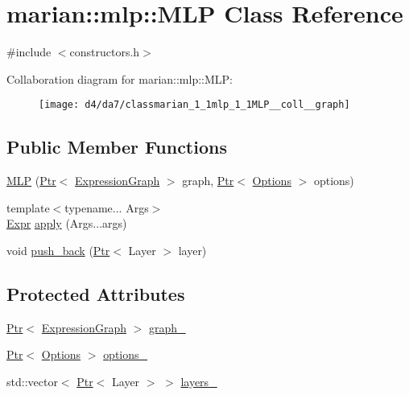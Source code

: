 \hypertarget{classmarian_1_1mlp_1_1MLP}{}\section{marian\+:\+:mlp\+:\+:M\+LP Class Reference}
\label{classmarian_1_1mlp_1_1MLP}


{\ttfamily \#include $<$constructors.\+h$>$}



Collaboration diagram for marian\+:\+:mlp\+:\+:M\+LP\+:
\nopagebreak
\begin{figure}[H]
\begin{center}
\leavevmode
\texttt{[image: d4/da7/classmarian\_1\_1mlp\_1\_1MLP\_\_coll\_\_graph]}
\end{center}
\end{figure}
\subsection*{Public Member Functions}
\begin{DoxyCompactItemize}
\item 
\hyperlink{classmarian_1_1mlp_1_1MLP_a40be5a4c5ed64d560e9c302998b0244b}{M\+LP} (\hyperlink{namespacemarian_ad1a373be43a00ef9ce35666145137b08}{Ptr}$<$ \hyperlink{classmarian_1_1ExpressionGraph}{Expression\+Graph} $>$ graph, \hyperlink{namespacemarian_ad1a373be43a00ef9ce35666145137b08}{Ptr}$<$ \hyperlink{classmarian_1_1Options}{Options} $>$ options)
\item 
{\footnotesize template$<$typename... Args$>$ }\\\hyperlink{namespacemarian_a498d8baf75b754011078b890b39c8e12}{Expr} \hyperlink{classmarian_1_1mlp_1_1MLP_a3c88c0c6c68738404792e801e3ea8e6d}{apply} (Args...\+args)
\item 
void \hyperlink{classmarian_1_1mlp_1_1MLP_a1da6e347d966206915a401dc76bbdf50}{push\+\_\+back} (\hyperlink{namespacemarian_ad1a373be43a00ef9ce35666145137b08}{Ptr}$<$ Layer $>$ layer)
\end{DoxyCompactItemize}
\subsection*{Protected Attributes}
\begin{DoxyCompactItemize}
\item 
\hyperlink{namespacemarian_ad1a373be43a00ef9ce35666145137b08}{Ptr}$<$ \hyperlink{classmarian_1_1ExpressionGraph}{Expression\+Graph} $>$ \hyperlink{classmarian_1_1mlp_1_1MLP_a61b6155380706d5c2afdbeeaa0994008}{graph\+\_\+}
\item 
\hyperlink{namespacemarian_ad1a373be43a00ef9ce35666145137b08}{Ptr}$<$ \hyperlink{classmarian_1_1Options}{Options} $>$ \hyperlink{classmarian_1_1mlp_1_1MLP_acd5930ecb6a6da66a793244071b10b5c}{options\+\_\+}
\item 
std\+::vector$<$ \hyperlink{namespacemarian_ad1a373be43a00ef9ce35666145137b08}{Ptr}$<$ Layer $>$ $>$ \hyperlink{classmarian_1_1mlp_1_1MLP_a79aa502c44a04f6eea99a6b304bd01e9}{layers\+\_\+}
\end{DoxyCompactItemize}


